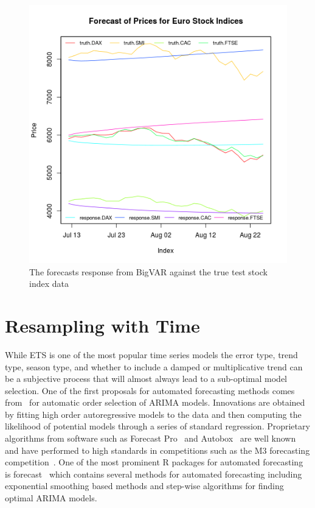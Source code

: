 \documentclass[12pt]{article}\usepackage[]{graphicx}\usepackage[]{color}
\theoremstyle{definition}
\let\proglang=\textsf
\newcommand{\pkg}[1]{{\fontseries{b}\selectfont #1}}
\begin{document}
\begin{figure}[H]
\includegraphics[width=.8\linewidth]{plot_bigvar_train.png}
\centering
\caption{The forecasts response from BigVAR against the true test stock index data}
\label{fig:bigvar_train}
\end{figure}
\doublespacing

\section{Resampling with Time}
\label{sec:resamp}


While ETS is one of the most popular time series models the error type, trend type, season type, and whether to include a damped or multiplicative trend can be a subjective process that will almost always lead to a sub-optimal model selection. One of the first proposals for automated forecasting methods comes from~\cite{hannanOrder} for automatic order selection of ARIMA models. Innovations are obtained by fitting high order autoregressive models to the data and then computing the likelihood of potential models through a series of standard regression. Proprietary algorithms from software such as \proglang{Forecast Pro}~\cite{forecastpro} and \proglang{Autobox}~\cite{reillyautobox} are well known and have performed to high standards in competitions such as the M3 forecasting competition~\cite{Makridakis2000451}. One of the most prominent R packages for automated forecasting is \pkg{forecast}~\cite{HyndForecast} which contains several methods for automated forecasting including exponential smoothing based methods and step-wise algorithms for finding optimal ARIMA models.
\end{document}

